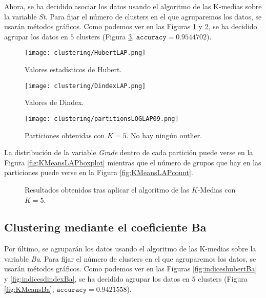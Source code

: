 Ahora, se ha decidido asociar los datos usando el algoritmo de las K-medias sobre la variable \emph{St}. Para fijar el número de clusters en el que agruparemos los datos, se usarán métodos gráficos. Como podemos ver en las Figuras \ref{fig:indiceshubertLAP} y \ref{fig:indicesdindexLAP}, se ha decidido agrupar los datos en $5$ clusters (Figura \ref{fig:KMeansLAP}, $\texttt{accuracy} = 0.9544702$).

\begin{figure}[H]
    \centering
    \texttt{[image: clustering/HubertLAP.png]}
    \caption{Valores estadísticos de Hubert.}
    \label{fig:indiceshubertLAP}
\end{figure}

\begin{figure}[H]
    \centering
    \texttt{[image: clustering/DindexLAP.png]}
    \caption{Valores de Dindex.}
    \label{fig:indicesdindexLAP}
\end{figure}

\begin{figure}[H]
    \centering
    \texttt{[image: clustering/partitionsLOGLAP09.png]}
    \caption{Particiones obtenidas con $K = 5$. No hay ningún outlier.}
    \label{fig:KMeansLAP}
\end{figure}

La distribución de la variable \emph{Grade} dentro de cada partición puede verse en la Figura \ref{fig:KMeansLAPboxplot} mientras que el número de grupos que hay en las particiones puede verse en la Figura \ref{fig:KMeansLAPcount}.

\begin{figure}[H]
\centering
{}\qquad
{}%
\caption{Resultados obtenidos tras aplicar el algoritmo de las $K$-Medias con $K = 5$.}
\label{fig:KMeansLAPdetails}
\end{figure}

\subsection{Clustering mediante el coeficiente Ba}

Por último, se agruparán los datos usando el algoritmo de las K-medias sobre la variable \emph{Ba}. Para fijar el número de clusters en el que agruparemos los datos, se usarán métodos gráficos. Como podemos ver en las Figuras \ref{fig:indiceshubertBa} y \ref{fig:indicesdindexBa}, se ha decidido agrupar los datos en $5$ clusters (Figura \ref{fig:KMeansBa}, $\texttt{accuracy} = 0.9421558$).

